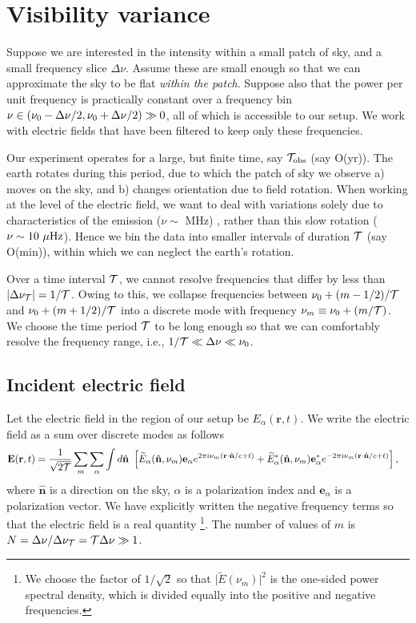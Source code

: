 \documentclass[11pt]{article}
\numberwithin{equation}{section}
\newcommand{\bt}[1]{\mathbf{#1}}
\newcommand{\wt}[1]{\widetilde{#1}}
\begin{document}
\section{Visibility variance}
\label{sec:visvar}

Suppose we are interested in the intensity within a small patch of sky, and a small frequency slice $\Delta \nu$. Assume these are small enough so that we can approximate the sky to be flat {\em within the patch}. Suppose also that the power per unit frequency is practically constant over a frequency bin $\nu \in (\nu_{\rm 0} - \Delta \nu/2, \nu_{\rm 0} + \Delta \nu/2) \gg 0$, all of which is accessible to our setup. We work with electric fields that have been filtered to keep only these frequencies.

Our experiment operates for a large, but finite time, say ${\cal T}_{\rm obs}$ (say O(yr)). The earth rotates during this period, due to which the patch of sky we observe a) moves on the sky, and b) changes orientation due to field rotation. When working at the level of the electric field, we want to deal with variations solely due to characteristics of the emission ($\nu \sim$ MHz) , rather than this slow rotation ($\nu \sim 10 \ \mu {\rm Hz}$). Hence we bin the data into smaller intervals of duration $\cal T$ (say O(min)), within which we can neglect the earth's rotation. 

Over a time interval $\cal T$, we cannot resolve frequencies that differ by less than $\vert \Delta \nu_{\cal T} \vert = 1/\cal T$. Owing to this, we collapse frequencies between $\nu_0 + (m-1/2)/\cal T$ and $\nu_0 + (m+1/2)/\cal T$ into a discrete mode with frequency $\nu_m \equiv \nu_0 + (m/\cal T)$. We choose the time period $\cal T$ to be long enough so that we can comfortably resolve the frequency range, i.e., $1/{\cal T} \ll \Delta \nu \ll \nu_0$.

\subsection{Incident electric field} 
\label{subsec:incident}

Let the electric field in the region of our setup be $E_\alpha(\bt r, t)$. We write the electric field as a sum over discrete modes as follows
\begin{align}
  {\bt E}(\bt r, t) & = \frac{1}{\sqrt{2 \cal T}} \sum_m  \sum_{\alpha} \int d\hat{\bt n} \ 
  \left[ \wt{E}_\alpha(\hat{\bt n}, \nu_m) {\bt e}_{\alpha} e^{2\pi i \nu_m (\bt r \cdot \hat{\bt n}/c + t)} + \wt{E}^\ast_\alpha(\hat{\bt n}, \nu_m) {\bt e}_{\alpha}^\ast e^{-2\pi i \nu_m (\bt r \cdot \hat{\bt n}/c + t)} \right] \mbox{,}  \label{eq:dft}
\end{align}
where $\hat{\bt n}$ is a direction on the sky, $\alpha$ is a polarization index and $\bt e_{\alpha}$ is a polarization vector. We have explicitly written the negative frequency terms so that the electric field is a real quantity \footnote{We choose the factor of $1/\sqrt{2}$ so that $\vert \wt{E}(\nu_m) \vert^2$ is the one-sided power spectral density, which is divided equally into the positive and negative frequencies.}. The number of values of $m$ is $N = \Delta \nu/\Delta \nu_{\cal T} = {\cal T }\Delta \nu \gg 1$. 
\end{document}
